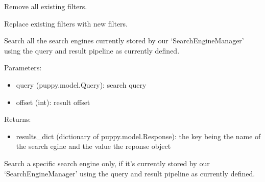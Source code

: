 \documentclass[letterpaper,10pt,english]{sphinxmanual}
\begin{document}
\begin{fulllineitems}
\begin{fulllineitems}
\end{fulllineitems}


\begin{fulllineitems}
\label{api3.0:puppy.pipeline.PipelineService.clear_filters}
Remove all existing filters.

\end{fulllineitems}


\begin{fulllineitems}
\label{api3.0:puppy.pipeline.PipelineService.replace_filters}
Replace existing filters with new filters.

\end{fulllineitems}


\begin{fulllineitems}
\label{api3.0:puppy.pipeline.PipelineService.searchAll}
Search all the search engines currently stored by our `SearchEngineManager' using the query and result pipeline as currently defined.

Parameters:
\begin{itemize}
\item {} 
query (puppy.model.Query): search query

\item {} 
offset (int): result offset

\end{itemize}

Returns:
\begin{itemize}
\item {} 
results\_dict (dictionary of puppy.model.Response): the key being the name of the search egine and the value the reponse object

\end{itemize}

\end{fulllineitems}


\begin{fulllineitems}
\label{api3.0:puppy.pipeline.PipelineService.searchSpecificEngine}
Search a specific search engine only, if it's currently stored by our `SearchEngineManager' using the query and result pipeline as currently defined.


\end{fulllineitems}
\end{fulllineitems}
\end{document}
